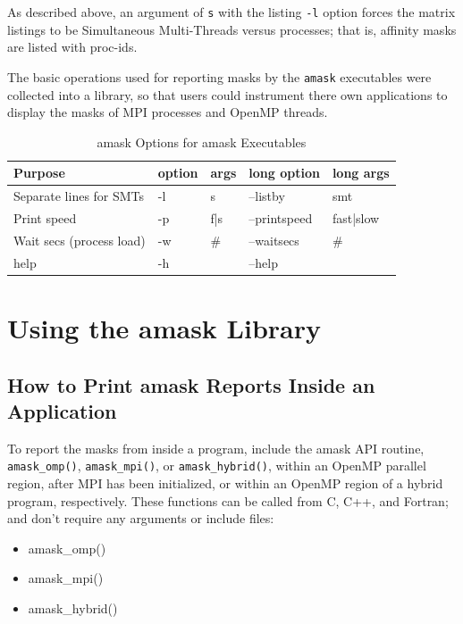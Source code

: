 \documentclass[10pt,a4paper]{report}
\begin{document}
As described above, an argument of \verb+s+ with the listing \verb+-l+ option forces the 
matrix listings to be Simultaneous Multi-Threads versus
processes; that is, affinity masks are listed with proc-ids. 


The basic operations used for reporting masks by the \verb+amask+ executables
were collected into a library, so that users
could instrument there own applications to display the masks of MPI processes
and OpenMP threads.

\begin{table}[ht]
\centering
\caption{amask Options for amask Executables}
\label{tab:amaskopts}
\begin{tabular}{|l|l|l|l|l|}
\hline
Purpose                  & option & args & long option  & long args  \\ \hline
Separate lines for SMTs  & -l     & s    & --listby     & smt        \\ \hline
Print speed              & -p     & f|s  & --printspeed & fast|slow  \\ \hline
Wait secs (process load) & -w     & \#   & --waitsecs   & \#         \\ \hline
help                     & -h     &      & --help       &            \\ \hline
\end{tabular}
\end{table}


\chapter{Using the amask Library}


\section{How to Print amask Reports Inside an Application}

To report the masks from inside a program, include the amask API routine, \verb+amask_omp()+,
\verb+amask_mpi()+, or \verb+amask_hybrid()+, within an OpenMP parallel region, after MPI has been
initialized, or within an OpenMP region of a hybrid program, respectively.  These functions can
be called from C, C++, and Fortran; and don't require any arguments or include files:  

\begin{itemize}
\item amask\_omp()
\item amask\_mpi()
\item amask\_hybrid()
\end{itemize}
\end{document}

